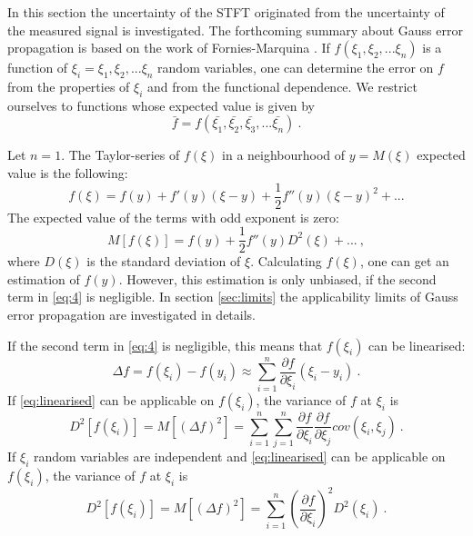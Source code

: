 \documentclass[a4paper,12pt,oneside]{article}
\begin{document}
In this section the uncertainty of the STFT originated from the uncertainty of the measured signal is investigated. The forthcoming summary about Gauss error propagation is based on the work of Fornies-Marquina \cite{fornies1997error}. If $f(\xi_1, \xi_2, ... \xi_n)$ is a function of $\xi_i = \xi_1, \xi_2, ... \xi_n$ random variables, one can determine the error on $f$ from the properties of $\xi_i$ and from the functional dependence. We restrict ourselves to functions whose expected value is given by
\begin{equation}\label{eq:restriction1}
  \bar{f} = f(\bar{\xi_1}, \bar{\xi_2}, \bar{\xi_3}, ... \bar{\xi_n}) \ .
\end{equation}

Let $n = 1$. The Taylor-series of $f(\xi)$ in a neighbourhood of $y = M(\xi)$ expected value is the following:
\begin{equation}\label{eq:3}
  f(\xi) = f(y) + f'(y)(\xi-y) + \frac{1}{2}f''(y)(\xi-y)^2 + ...
\end{equation}
The expected value of the terms with odd exponent is zero:
\begin{equation}\label{eq:4}
  M[f(\xi)] = f(y) + \frac{1}{2}f''(y)D^2(\xi) + ... \ ,
\end{equation}
where $D(\xi)$ is the standard deviation of $\xi$.
Calculating $f(\xi)$, one can get an estimation of $f(y)$. However, this estimation is only unbiased, if the second term in \eqref{eq:4} is negligible. In section \ref{sec:limits} the applicability limits of Gauss error propagation are investigated in details.

If the second term in \eqref{eq:4} is negligible, this means that $f(\xi_i)$ can be linearised:
\begin{equation}\label{eq:linearised}
   \Delta f = f(\xi_i) - f(y_i) \approx \sum\limits_{i=1}^n \frac{\partial f}{\partial \xi_i} (\xi_i - y_i) \ .
\end{equation}
If \eqref{eq:linearised} can be applicable on $f(\xi_i)$, the variance of $f$ at $\xi_i$ is
\begin{equation}\label{eq:variance}
  D^2 \left[ f(\xi_i) \right] = M \left[ (\Delta f)^2 \right] = \sum\limits_{i=1}^n \sum\limits_{j=1}^n \frac{\partial f}{\partial \xi_i} \frac{\partial f}{\partial \xi_j} cov(\xi_i, \xi_j) \ .
\end{equation}
If $\xi_i$ random variables are independent and \eqref{eq:linearised} can be applicable on $f(\xi_i)$, the variance of $f$ at $\xi_i$ is
\begin{equation}\label{eq:variance_ind}
  D^2 \left[ f(\xi_i) \right] = M \left[ (\Delta f)^2 \right] = \sum\limits_{i=1}^n \left( \frac{\partial f}{\partial \xi_i} \right)^2 D^2(\xi_i) \ .
\end{equation}
\end{document}
